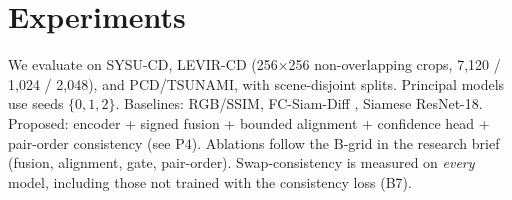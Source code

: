 \section{Experiments}
\label{sec:experiments}


We evaluate on SYSU-CD, LEVIR-CD (256$\times$256 non-overlapping
crops, 7{,}120 / 1{,}024 / 2{,}048), and PCD/TSUNAMI, with
scene-disjoint splits. Principal models use seeds $\{0,1,2\}$.
Baselines: RGB/SSIM, FC-Siam-Diff \cite{daudt_2018_fcsiam}, Siamese
ResNet-18. Proposed: encoder + signed fusion + bounded alignment +
confidence head + pair-order consistency (see P4). Ablations follow
the B-grid in the research brief (fusion, alignment, gate, pair-order).
Swap-consistency is measured on \emph{every} model, including those
not trained with the consistency loss (B7).
